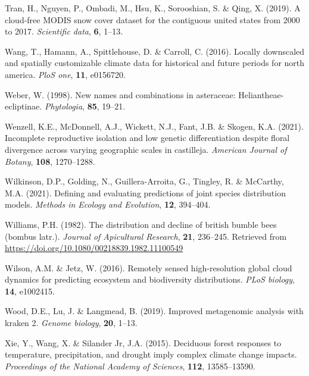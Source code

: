 \documentclass[
]{article}
\newlength{\cslhangindent}
\newlength{\cslentryspacingunit} %
\newenvironment{CSLReferences}[2] %
 {%
  \setlength{\parindent}{0pt}
  \ifodd #1
  \let\oldpar\par
  \def\par{\hangindent=\cslhangindent\oldpar}
  \fi
  \setlength{\parskip}{#2\cslentryspacingunit}
 }%
 {}
\begin{document}
\begin{CSLReferences}{1}{0}
\leavevmode{}%
Tran, H., Nguyen, P., Ombadi, M., Hsu, K., Sorooshian, S. \& Qing, X.
(2019). A cloud-free MODIS snow cover dataset for the contiguous united
states from 2000 to 2017. \emph{Scientific data}, \textbf{6}, 1--13.

\leavevmode{}%
Wang, T., Hamann, A., Spittlehouse, D. \& Carroll, C. (2016). Locally
downscaled and spatially customizable climate data for historical and
future periods for north america. \emph{PloS one}, \textbf{11},
e0156720.

\leavevmode{}%
Weber, W. (1998). New names and combinations in asteraceae:
Heliantheae-ecliptinae. \emph{Phytologia}, \textbf{85}, 19--21.

\leavevmode{}%
Wenzell, K.E., McDonnell, A.J., Wickett, N.J., Fant, J.B. \& Skogen,
K.A. (2021). Incomplete reproductive isolation and low genetic
differentiation despite floral divergence across varying geographic
scales in castilleja. \emph{American Journal of Botany}, \textbf{108},
1270--1288.

\leavevmode{}%
Wilkinson, D.P., Golding, N., Guillera-Arroita, G., Tingley, R. \&
McCarthy, M.A. (2021). Defining and evaluating predictions of joint
species distribution models. \emph{Methods in Ecology and Evolution},
\textbf{12}, 394--404.

\leavevmode{}%
Williams, P.H. (1982). The distribution and decline of british bumble
bees (bombus latr.). \emph{Journal of Apicultural Research},
\textbf{21}, 236--245. Retrieved from
\url{https://doi.org/10.1080/00218839.1982.11100549}

\leavevmode{}%
Wilson, A.M. \& Jetz, W. (2016). Remotely sensed high-resolution global
cloud dynamics for predicting ecosystem and biodiversity distributions.
\emph{PLoS biology}, \textbf{14}, e1002415.

\leavevmode{}%
Wood, D.E., Lu, J. \& Langmead, B. (2019). Improved metagenomic analysis
with kraken 2. \emph{Genome biology}, \textbf{20}, 1--13.

\leavevmode{}%
Xie, Y., Wang, X. \& Silander Jr, J.A. (2015). Deciduous forest
responses to temperature, precipitation, and drought imply complex
climate change impacts. \emph{Proceedings of the National Academy of
Sciences}, \textbf{112}, 13585--13590.


\end{CSLReferences}
\end{document}
